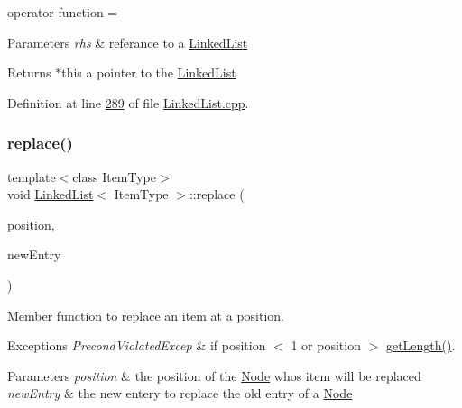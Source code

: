 operator function = 


\begin{DoxyParams}{Parameters}
{\em rhs} & referance to a \hyperlink{classLinkedList}{Linked\+List} \\
\hline
\end{DoxyParams}
\begin{DoxyReturn}{Returns}
$\ast$this a pointer to the \hyperlink{classLinkedList}{Linked\+List} 
\end{DoxyReturn}


Definition at line \hyperlink{LinkedList_8cpp_source_l00289}{289} of file \hyperlink{LinkedList_8cpp_source}{Linked\+List.\+cpp}.

\mbox{\label{classLinkedList_a3035f880c50e7d8f68e67c093d4607ca}} 
\subsubsection{\texorpdfstring{replace()}{replace()}}
{\footnotesize\ttfamily template$<$class Item\+Type$>$ \\
void \hyperlink{classLinkedList}{Linked\+List}$<$ Item\+Type $>$\+::replace (\begin{DoxyParamCaption}\item[{int}]{position,  }\item[{const Item\+Type \&}]{new\+Entry }\end{DoxyParamCaption})\hspace{0.3cm}{\ttfamily [virtual]}}



Member function to replace an item at a position. 


\begin{DoxyExceptions}{Exceptions}
{\em Precond\+Violated\+Excep} & if position $<$ 1 or position $>$ \hyperlink{classLinkedList_a61d045ef6008b494a1a516ecc992c0e7}{get\+Length()}.\\
\hline
\end{DoxyExceptions}

\begin{DoxyParams}{Parameters}
{\em position} & the position of the \hyperlink{classNode}{Node} whos item will be replaced \\
\hline
{\em new\+Entry} & the new entery to replace the old entry of a \hyperlink{classNode}{Node} \\
\hline
\end{DoxyParams}


